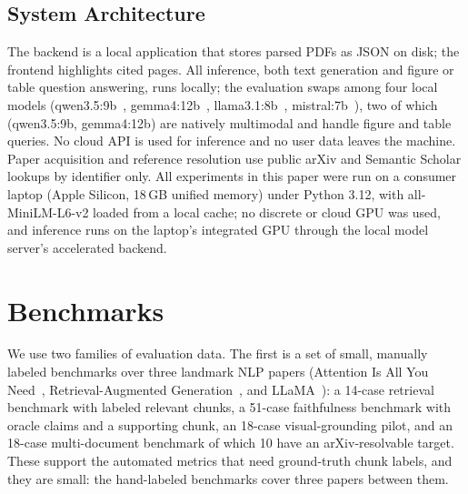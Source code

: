\documentclass[11pt,letterpaper]{article}
\begin{document}
\subsection{System Architecture}
The backend is a local application that stores parsed PDFs as JSON on disk; the
frontend highlights cited pages. All inference, both text generation and figure or
table question answering, runs locally; the evaluation swaps among four local models
(qwen3.5:9b~\citep{qwenteam2026qwen35}, gemma4:12b~\citep{gemmateam2024gemma},
llama3.1:8b~\citep{llamateam2024llama3}, mistral:7b~\citep{jiang2023mistral}),
two of which (qwen3.5:9b, gemma4:12b) are natively multimodal and handle figure and
table queries. No cloud API is used for inference and no user data leaves the machine. Paper
acquisition and reference resolution use public arXiv and Semantic Scholar lookups
by identifier only. All
experiments in this paper were run on a consumer laptop (Apple Silicon, 18\,GB
unified memory) under Python 3.12, with all-MiniLM-L6-v2 loaded from a local cache;
no discrete or cloud GPU was used, and inference runs on the laptop's integrated GPU
through the local model server's accelerated backend.

\section{Benchmarks}
\label{sec:datasets}
We use two families of evaluation data. The first is a set of small, manually
labeled benchmarks over three landmark NLP papers (Attention Is All You
Need~\citep{vaswani2017attention}, Retrieval-Augmented
Generation~\citep{lewis2020rag}, and LLaMA~\citep{touvron2023llama}): a 14-case
retrieval benchmark with labeled relevant chunks, a 51-case faithfulness benchmark
with oracle claims and a supporting chunk, an 18-case visual-grounding pilot, and an
18-case multi-document benchmark of which 10 have an arXiv-resolvable target. These
support the automated metrics that need ground-truth chunk labels, and they are
small: the hand-labeled benchmarks cover three papers between them.
\end{document}
